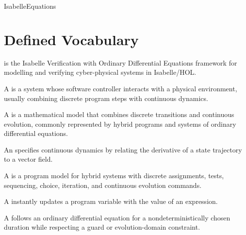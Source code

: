 \documentclass[hidelinks]{article}
\begin{document}
\begin{smodule}[title={IsaVODEs: Interactive Verification of Cyber-Physical Systems at Scale}]{IsabelleEquations}
\section{Defined Vocabulary}

\begin{sdefinition}[for=IsaVODEs]
     is the Isabelle Verification with Ordinary Differential Equations framework for modelling and verifying cyber-physical systems in Isabelle/HOL.
\end{sdefinition}

\begin{sdefinition}[for=CyberPhysicalSystem]
    A  is a system whose software controller interacts with a physical environment, usually combining discrete program steps with continuous dynamics.
\end{sdefinition}

\begin{sdefinition}[for=HybridSystem]
    A  is a mathematical model that combines discrete transitions and continuous evolution, commonly represented by hybrid programs and systems of ordinary differential equations.
\end{sdefinition}

\begin{sdefinition}[for=ODE]
    An  specifies continuous dynamics by relating the derivative of a state trajectory to a vector field.
\end{sdefinition}

\begin{sdefinition}[for=HybridProgram]
    A  is a program model for hybrid systems with discrete assignments, tests, sequencing, choice, iteration, and continuous evolution commands.
\end{sdefinition}

\begin{sdefinition}[for=DiscreteAssignment]
    A  instantly updates a program variable with the value of an expression.
\end{sdefinition}

\begin{sdefinition}[for=ContinuousEvolution]
    A  follows an ordinary differential equation for a nondeterministically chosen duration while respecting a guard or evolution-domain constraint.
\end{sdefinition}


\end{smodule}
\end{document}
